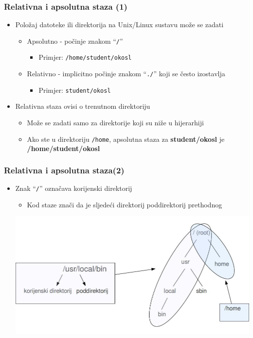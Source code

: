 \documentclass{beamer}
\newcommand{\shell}[1]{\texttt{#1}}
\begin{document}
\begin{frame}[t]
\frametitle{Relativna i apsolutna staza (1)}
\begin{itemize}
  \item Položaj datoteke ili direktorija na Unix/Linux sustavu može se
        zadati
  \begin{itemize}
    \item Apsolutno - počinje znakom ``\texttt{/}''
    \begin{itemize}
      \item[] Primjer: \texttt{/home/student/okosl}
    \end{itemize}
	\item Relativno - implicitno počinje znakom ``\texttt{./}'' koji se često izostavlja
    \begin{itemize}
      \item[] Primjer: \texttt{student/okosl}
    \end{itemize}
  \end{itemize}

  \item Relativna staza ovisi o trenutnom direktoriju
  \begin{itemize}
    \item Može se zadati samo za direktorije koji su niže u hijerarhiji
    \item Ako ste u direktoriju \shell{/home}, apsolutna staza za
          \textbf{student/okosl} je \textbf{/home/student/okosl}
  \end{itemize}
\end{itemize}
\end{frame}

\begin{frame}[t]
\frametitle{Relativna i apsolutna staza(2)}
\begin{itemize}
  \item Znak ``\texttt{/}'' označava korijenski direktorij
  \begin{itemize}
    \item Kod staze znači da je sljedeći direktorij poddirektorij
          prethodnog
  \end{itemize}
  \centering
  \includegraphics[scale=0.3]{filetree-detail.jpg}
\end{itemize}
\end{frame}
\end{document}
